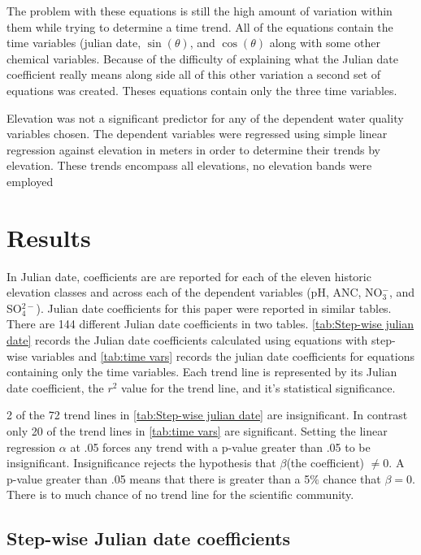 %
 The problem with these equations is still the high amount of variation within them while trying to determine a time trend.  All of the equations contain the time variables (julian date, $\sin(\theta)$, and $\cos(\theta)$ along with some other chemical variables.  Because of the difficulty of explaining what the Julian date coefficient really means along side all of this other variation a second set of equations was created.  Theses equations contain only the three time variables.
 
 Elevation was not a significant predictor for any of the dependent water quality variables chosen.  The dependent variables were regressed using simple linear regression against elevation in meters in order to determine their trends by elevation.  These trends encompass all elevations, no elevation bands were employed
 
\section{Results}

In \citet{robinson2008ph} Julian date, coefficients are are reported for each of the eleven historic elevation classes and across each of the dependent variables (pH, ANC, NO$_3^-$, and SO$_4^{2-}$).  Julian date coefficients for this paper were reported in similar tables.  There are 144 different Julian date coefficients in two tables.  \autoref{tab:Step-wise julian date} records the Julian date coefficients calculated using equations with step-wise variables and \autoref{tab:time vars} records the julian date coefficients for  equations containing only the time variables.  Each trend line is represented by its Julian date coefficient, the $r^2$ value for the trend line, and it's statistical significance.

2 of the 72 trend lines in \autoref{tab:Step-wise julian date} are insignificant.  In contrast only 20 of the trend lines in \autoref{tab:time vars} are significant.   Setting the linear regression $\alpha$ at .05 forces any trend with a p-value greater than .05 to be insignificant.  Insignificance rejects the hypothesis that $\beta$(the coefficient) $\neq 0$.  A p-value greater than .05 means that there is greater than a 5$\%$ chance that $\beta=0$.  There is to much chance of no trend line for the scientific community.

\subsection{Step-wise Julian date coefficients}

